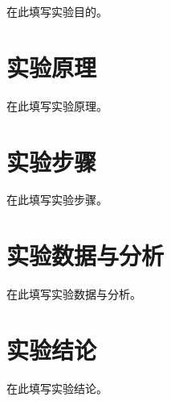 \documentclass[UTF8,a4paper,12pt]{ctexart}
\begin{document}
在此填写实验目的。

\section{实验原理}

在此填写实验原理。

\section{实验步骤}

在此填写实验步骤。

\section{实验数据与分析}

在此填写实验数据与分析。

\section{实验结论}

在此填写实验结论。
\end{document}
